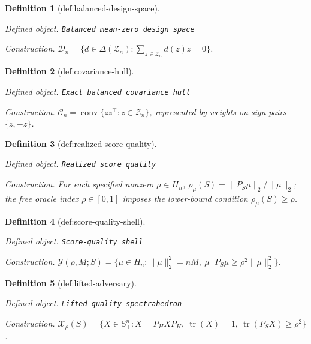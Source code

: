 \documentclass{article}
\newtheorem{definition}{Definition}
\begin{document}
\begin{definition}[def:balanced-design-space]\label{def:balanced-design-space}
\par\smallskip\noindent\emph{Defined object.} \texttt{Balanced mean-\allowbreak{}zero design space}
\par\smallskip\noindent\emph{Construction.} \(\mathcal D_n=\{d\in\Delta(\mathcal Z_n):\sum_{z\in\mathcal Z_n}d(z)z=0\}\).
\end{definition}

\begin{definition}[def:covariance-hull]\label{def:covariance-hull}
\par\smallskip\noindent\emph{Defined object.} \texttt{Exact balanced covariance hull}
\par\smallskip\noindent\emph{Construction.} \(\mathcal C_n=\operatorname{conv}\{zz^\top:z\in\mathcal Z_n\}\), represented by weights on sign-pairs \(\{z,-z\}\).
\end{definition}

\begin{definition}[def:realized-score-quality]\label{def:realized-score-quality}
\par\smallskip\noindent\emph{Defined object.} \texttt{Realized score quality}
\par\smallskip\noindent\emph{Construction.} For each specified nonzero \(\mu\in H_n\), \(\rho_{\mu}(S)=\|P_S\mu\|_2/\|\mu\|_2\); the free oracle index \(\rho\in[0,1]\) imposes the lower-bound condition \(\rho_{\mu}(S)\geq\rho\).
\end{definition}

\begin{definition}[def:score-quality-shell]\label{def:score-quality-shell}
\par\smallskip\noindent\emph{Defined object.} \texttt{Score-\allowbreak{}quality shell}
\par\smallskip\noindent\emph{Construction.} \(\mathcal Y(\rho,M;S)=\{\mu\in H_n:\|\mu\|_2^2=nM,\ \mu^\top P_S\mu\geq\rho^2\|\mu\|_2^2\}\).
\end{definition}

\begin{definition}[def:lifted-adversary]\label{def:lifted-adversary}
\par\smallskip\noindent\emph{Defined object.} \texttt{Lifted quality spectrahedron}
\par\smallskip\noindent\emph{Construction.} \(\mathcal X_\rho(S)=\{X\in\mathbb S_+^n:X=P_HXP_H,\ \operatorname{tr}(X)=1,\ \operatorname{tr}(P_SX)\geq\rho^2\}\).
\end{definition}
\end{document}
